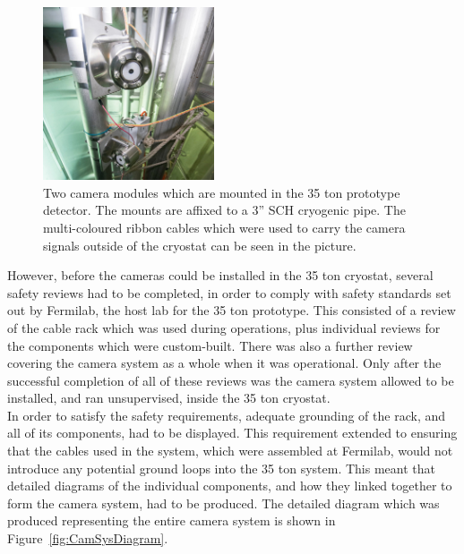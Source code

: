 \begin{figure}
  \centering
  \includegraphics[width=0.45\textwidth]{cammount35tcrop}
  \caption[Two camera modules which are mounted in the 35 ton prototype detector]
          {Two camera modules which are mounted in the 35 ton prototype detector. The mounts are affixed to a 3'' SCH cryogenic pipe. The multi-coloured ribbon cables which were used to carry the camera signals outside of the cryostat can be seen in the picture.}
  \label{fig:CamMount}
\end{figure}

However, before the cameras could be installed in the 35 ton cryostat, several safety reviews had to be completed, in order to comply with safety standards set out by Fermilab, the host lab for the 35 ton prototype. This consisted of a review of the cable rack which was used during operations, plus individual reviews for the components which were custom-built. There was also a further review covering the camera system as a whole when it was operational. Only after the successful completion of all of these reviews was the camera system allowed to be installed, and ran unsupervised, inside the 35 ton cryostat. \\

In order to satisfy the safety requirements, adequate grounding of the rack, and all of its components, had to be displayed. This requirement extended to ensuring that the cables used in the system, which were assembled at Fermilab, would not introduce any potential ground loops into the 35 ton system. This meant that detailed diagrams of the individual components, and how they linked together to form the camera system, had to be produced. The detailed diagram which was produced representing the entire camera system is shown in Figure~\ref{fig:CamSysDiagram}. \\

